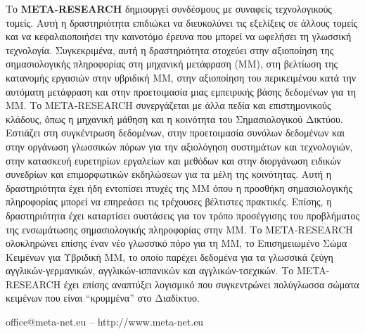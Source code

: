 \documentclass[]{../../metanetpaper}
\begin{document}
\begin{multicols}{2}
Το \textbf{META-RESEARCH} δημιουργεί συνδέσμους με συναφείς τεχνολογικούς τομείς. Αυτή η δραστηριότητα επιδιώκει να διευκολύνει τις εξελίξεις σε άλλους τομείς και να κεφαλαιοποιήσει την καινοτόμο έρευνα που μπορεί να ωφελήσει τη γλωσσική τεχνολογία. Συγκεκριμένα, αυτή η δραστηριότητα στοχεύει στην αξιοποίηση της σημασιολογικής πληροφορίας στη μηχανική μετάφραση (MΜ), στη βελτίωση της κατανομής εργασιών στην υβριδική MΜ, στην αξιοποίηση του περικειμένου κατά την αυτόματη μετάφραση και στην προετοιμασία μιας εμπειρικής βάσης δεδομένων για τη ΜΜ. Το META-RESEARCH συνεργάζεται με άλλα πεδία και επιστημονικούς κλάδους, όπως η μηχανική μάθηση και η κοινότητα του Σημασιολογικού Δικτύου. Εστιάζει στη συγκέντρωση δεδομένων, στην προετοιμασία συνόλων δεδομένων και στην οργάνωση γλωσσικών πόρων για την αξιολόγηση συστημάτων και τεχνολογιών, στην κατασκευή ευρετηρίων εργαλείων και μεθόδων και στην διοργάνωση ειδικών συνεδρίων και επιμορφωτικών εκδηλώσεων για τα μέλη της κοινότητας. Αυτή η δραστηριότητα έχει ήδη εντοπίσει πτυχές της MΜ όπου η προσθήκη σημασιολογικής πληροφορίας μπορεί να επηρεάσει τις τρέχουσες βέλτιστες πρακτικές. Επίσης, η δραστηριότητα έχει καταρτίσει συστάσεις για τον τρόπο προσέγγισης του προβλήματος της ενσωμάτωσης σημασιολογικής πληροφορίας στην MΜ. Το META-RESEARCH ολοκληρώνει επίσης έναν νέο γλωσσικό πόρο για τη MΜ, το Επισημειωμένο Σώμα Κειμένων για Υβριδική ΜΜ, το οποίο παρέχει δεδομένα για τα γλωσσικά ζεύγη αγγλικών-γερμανικών, αγγλικών-ισπανικών και αγγλικών-τσεχικών. Το META-RESEARCH έχει επίσης αναπτύξει λογισμικό που συγκεντρώνει πολύγλωσσα σώματα κειμένων που είναι “κρυμμένα” στο Διαδίκτυο.
\end{multicols}

\vfill
\centerline{office@meta-net.eu -- http://www.meta-net.eu}


\setcounter{section}{0}
\setcounter{figure}{0}

\cleardoublepage


\end{document}
